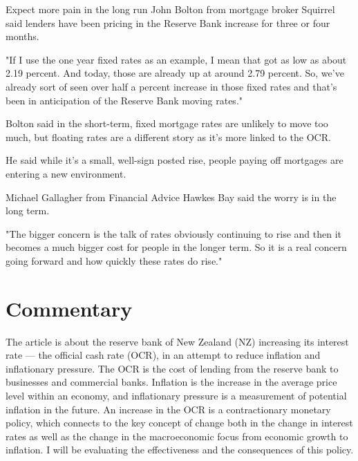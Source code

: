\documentclass[a4paper,12pt]{article}
\begin{document}
Expect more pain in the long run
John Bolton from mortgage broker Squirrel said lenders have been pricing in the Reserve Bank increase for three or four months.

"If I use the one year fixed rates as an example, I mean that got as low as about 2.19 percent. And today, those are already up at around 2.79 percent. So, we've already sort of seen over half a percent increase in those fixed rates and that's been in anticipation of the Reserve Bank moving rates."

Bolton said in the short-term, fixed mortgage rates are unlikely to move too much, but floating rates are a different story as it's more linked to the OCR.

He said while it's a small, well-sign posted rise, people paying off mortgages are entering a new environment.

Michael Gallagher from Financial Advice Hawkes Bay said the worry is in the long term.

"The bigger concern is the talk of rates obviously continuing to rise and then it becomes a much bigger cost for people in the longer term. So it is a real concern going forward and how quickly these rates do rise."

\newpage

\section*{Commentary}

The article is about the reserve bank of New Zealand (NZ) increasing its interest rate --- the official cash rate (OCR), in an attempt to reduce inflation and inflationary pressure. The OCR is the cost of lending from the reserve bank to businesses and commercial banks. Inflation is the increase in the average price level within an economy, and inflationary pressure is a measurement of potential inflation in the future. An increase in the OCR is a contractionary monetary policy, which connects to the key concept of change both in the change in interest rates as well as the change in the macroeconomic focus from economic growth to inflation. I will be evaluating the effectiveness and the consequences of this policy.
\end{document}
